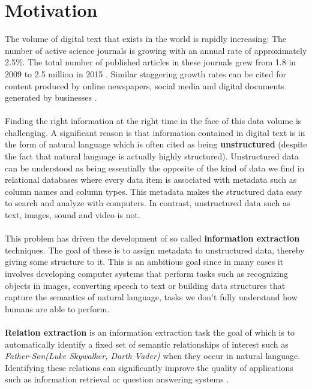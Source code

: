 \section{Motivation}
The volume of digital text that exists in the world is rapidly increasing: The number of active science journals is growing with an annual rate of approximately 2.5\%. The total number of published articles in these journals grew from 1.8 in 2009 to 2.5 million in 2015 \citep{ware2009, ware2015}. Similar staggering growth rates can be cited for content produced by online newspapers, social media and digital documents generated by businesses \citep{perrin2015, mitchell2015}.
\\\\
Finding the right information at the right time in the face of this data volume is challenging. A significant reason is that information contained in digital text is in the form of natural language which is often cited as being \textbf{unstructured} (despite the fact that natural language is actually highly structured). Unstructured data can be understood as being essentially the opposite of the kind of data we find in relational databases where every data item is associated with metadata such as column names and column types. This metadata makes the structured data easy to search and analyze with computers. In contrast, unstructured data such as text, images, sound and video is not.
\\\\
This problem has driven the development of so called \textbf{information extraction} techniques. The goal of these is to assign metadata to unstructured data, thereby giving some structure to it. This is an ambitious goal since in many cases it involves developing computer systems that perform tasks such as recognizing objects in images, converting speech to text or building data structures that capture the semantics of natural language, tasks we don't fully understand how humans are able to perform.
\\\\
\textbf{Relation extraction} is an information extraction task the goal of which is to automatically identify a fixed set of semantic relationships of interest such as \textit{Father-Son(Luke Skywalker, Darth Vader)} when they occur in natural language. Identifying these relations can significantly improve the quality of applications such as information retrieval or question answering systems \citep{jurafsky09}.

